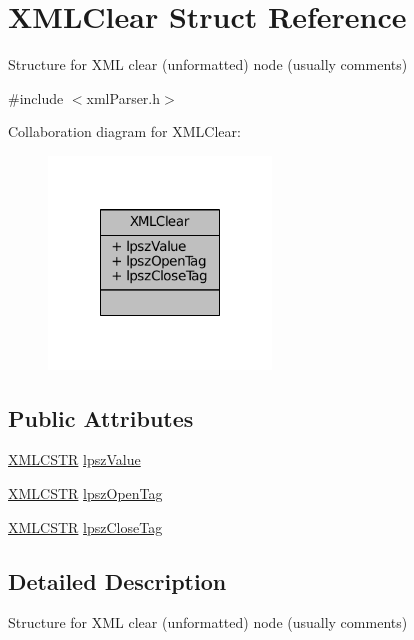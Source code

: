 \hypertarget{structXMLClear}{\section{X\-M\-L\-Clear Struct Reference}
\label{structXMLClear}
}


Structure for X\-M\-L clear (unformatted) node (usually comments)  




{\ttfamily \#include $<$xml\-Parser.\-h$>$}



Collaboration diagram for X\-M\-L\-Clear\-:
\nopagebreak
\begin{figure}[H]
\begin{center}
\leavevmode
\includegraphics[width=168pt]{structXMLClear__coll__graph}
\end{center}
\end{figure}
\subsection*{Public Attributes}
\begin{DoxyCompactItemize}
\item 
\hyperlink{xmlParser_8h_acdb0d6fd8dd596384b438d86cfb2b182}{X\-M\-L\-C\-S\-T\-R} \hyperlink{structXMLClear_a72d26ba6f77bdfc5fdaf0e0802d8809e}{lpsz\-Value}
\item 
\hyperlink{xmlParser_8h_acdb0d6fd8dd596384b438d86cfb2b182}{X\-M\-L\-C\-S\-T\-R} \hyperlink{structXMLClear_a2df4ad4786cc0d3f7eae94607a02f6e3}{lpsz\-Open\-Tag}
\item 
\hyperlink{xmlParser_8h_acdb0d6fd8dd596384b438d86cfb2b182}{X\-M\-L\-C\-S\-T\-R} \hyperlink{structXMLClear_a28c30d46f2965cfdea9dcd7ff10e0386}{lpsz\-Close\-Tag}
\end{DoxyCompactItemize}


\subsection{Detailed Description}
Structure for X\-M\-L clear (unformatted) node (usually comments) 

